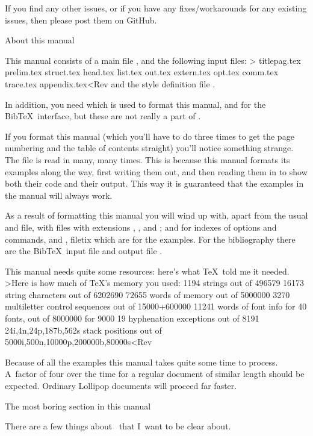  
If you find any other issues, or if you have any fixes/workarounds
for any existing issues, then please post them on GitHub.

\Section About this manual

This manual consists of a main file , and the
following input files:
\Ver>
titlepag.tex prelim.tex struct.tex head.tex list.tex
out.tex extern.tex opt.tex comm.tex trace.tex appendix.tex<Rev
and the style definition file .

In addition, you need  which is used to format this
manual, and  for the Bib\TeX\ interface, but these
are not really a part of \Lollipop.

If you format this manual (which you'll have to do three times
to get the page numbering and the table of contents straight) you'll
notice something strange. The file  is read in
many, many times. This is because this manual formats its examples
along the way, first writing them out, and then reading them in to
show both their code and their output. This way it is guaranteed that
the examples in the manual will always work.

As a result of formatting this manual you will wind up with, apart
from the usual  and  file, with  files
with extensions , , and ; 
 and  for indexes of options and commands,
and
, file{tix} which are for the examples. For the
bibliography there are the Bib\TeX\ input file  and
output file .

This manual needs quite some resources: here's what \TeX\ told me
it needed.
\Ver>Here is how much of TeX's memory you used:
 1194 strings out of 496579
 16173 string characters out of 6202690
 72655 words of memory out of 5000000
 3270 multiletter control sequences out of 15000+600000
 11241 words of font info for 40 fonts, out of 8000000 for 9000
 19 hyphenation exceptions out of 8191
 24i,4n,24p,187b,562s stack positions out of 5000i,500n,10000p,200000b,80000s<Rev


Because of all the examples this manual takes quite some time to
process. A~factor of four over the time for a regular document of
similar length should be expected. Ordinary Lollipop documents will
proceed far faster.

\Section The most boring section in this manual

There are a few things about \Lollipop\ that I~want to be clear about.

